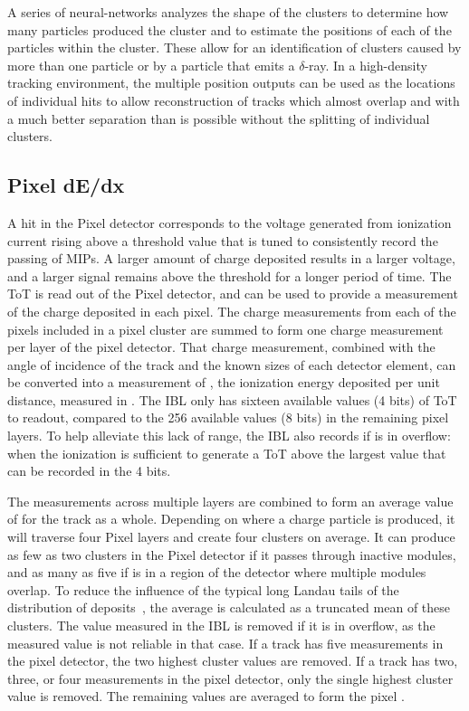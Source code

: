 A series of neural-networks analyzes the shape of the clusters to determine how many particles produced the cluster and to estimate the positions of each of the particles within the cluster.
These allow for an identification of clusters caused by more than one particle or by a particle that emits a $\delta$-ray.
In a high-density tracking environment, the multiple position outputs can be used as the locations of individual hits to allow reconstruction of tracks which almost overlap and with a much better separation than is possible without the splitting of individual clusters.

\subsection{Pixel dE/dx}
\label{sec:pixel_dedx}

A hit in the Pixel detector corresponds to the voltage generated from ionization current rising above a threshold value that is tuned to consistently record the passing of \acp{MIP}. 
A larger amount of charge deposited results in a larger voltage, and a larger signal remains above the threshold for a longer period of time.
The \ac{ToT} is read out of the Pixel detector, and can be used to provide a measurement of the charge deposited in each pixel.
The charge measurements from each of the pixels included in a pixel cluster are summed to form one charge measurement per layer of the pixel detector.
That charge measurement, combined with the angle of incidence of the track and the known sizes of each detector element, can be converted into a measurement of \dedx, the ionization energy deposited per unit distance, measured in \MeVgcm. 
The \ac{IBL} only has sixteen available values (4 bits) of \ac{ToT} to readout, compared to the 256 available values (8 bits) in the remaining pixel layers.
To help alleviate this lack of range, the \ac{IBL} also records if is in overflow: when the ionization is sufficient to generate a \ac{ToT} above the largest value that can be recorded in the 4 bits.

The measurements across multiple layers are combined to form an average value of \dedx for the track as a whole.
Depending on where a charge particle is produced, it will traverse four Pixel layers and create four clusters on average.
It can produce as few as two clusters in the Pixel detector if it passes through inactive modules, and as many as five if is in a region of the detector where multiple modules overlap.
To reduce the influence of the typical long Landau tails of the distribution of \dedx deposits~\cite{pdg}, the average is calculated as a truncated mean of these clusters.
The value measured in the \ac{IBL} is removed if it is in overflow, as the measured value is not reliable in that case.
If a track has five measurements in the pixel detector, the two highest cluster values are removed.
If a track has two, three, or four measurements in the pixel detector, only the single highest cluster value is removed.
The remaining values are averaged to form the pixel \dedx.

